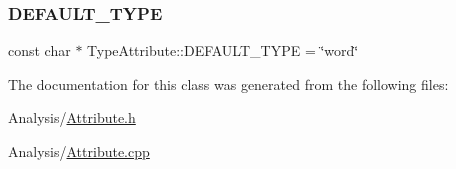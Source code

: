 \subsubsection{\texorpdfstring{D\+E\+F\+A\+U\+L\+T\+\_\+\+T\+Y\+PE}{DEFAULT\_TYPE}}
{\footnotesize\ttfamily const char $\ast$ Type\+Attribute\+::\+D\+E\+F\+A\+U\+L\+T\+\_\+\+T\+Y\+PE = \char`\"{}word\char`\"{}\hspace{0.3cm}{\ttfamily [static]}}



The documentation for this class was generated from the following files\+:\begin{DoxyCompactItemize}
\item 
Analysis/\mbox{\hyperlink{Analysis_2Attribute_8h}{Attribute.\+h}}\item 
Analysis/\mbox{\hyperlink{Analysis_2Attribute_8cpp}{Attribute.\+cpp}}\end{DoxyCompactItemize}
